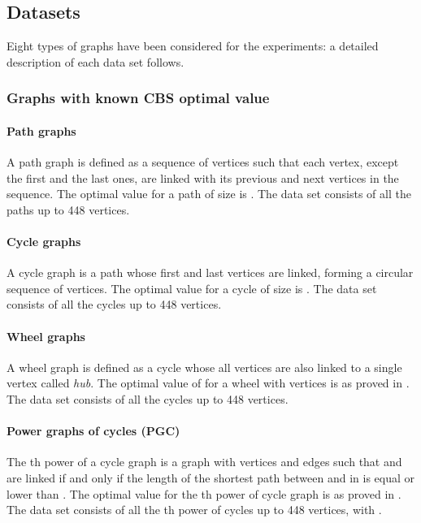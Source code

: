 \documentclass{scrartcl}
\theoremstyle{plain}
\newcommand{\cbs}{CBS}
\begin{document}
\subsection{Datasets}

Eight types of graphs have been considered for the experiments: a detailed 
description of each data set follows.

\subsubsection{Graphs with known \cbs{} optimal value}

\paragraph{\textbf{Path graphs}}
A path graph is defined as a sequence of vertices such that each vertex, except 
the first and the last ones, are linked with its previous and next vertices in 
the sequence. The optimal value for a path  of size  is 
. The data set consists of all the paths up to 
448 vertices.

\paragraph{\textbf{Cycle graphs}}
A cycle graph is a path whose first and last vertices are linked, 
forming a circular sequence of vertices. The optimal value for a cycle  of 
size  is . The data set consists of all the 
cycles up to 448 vertices.

\paragraph{\textbf{Wheel graphs}}
A wheel graph is defined as a cycle whose all vertices are also linked to a 
single 
vertex called \emph{hub}. The optimal value of  for a wheel  with 
 vertices is   as proved in \cite{Jianxiu2001}. The data set consists of all the 
cycles up to 448 vertices.

\paragraph{\textbf{Power graphs of cycles (PGC)}}
The th power of a cycle graph  is a graph with  vertices and edges 
such that  and  are linked if and only if the length of the shortest path 
between  and  in  is equal or lower than . The optimal value for 
the th power of cycle graph  is  as proved in \cite{Jianxiu2001}. The data set consists of 
all the th power of cycles up to 448 vertices, with .
\end{document}
